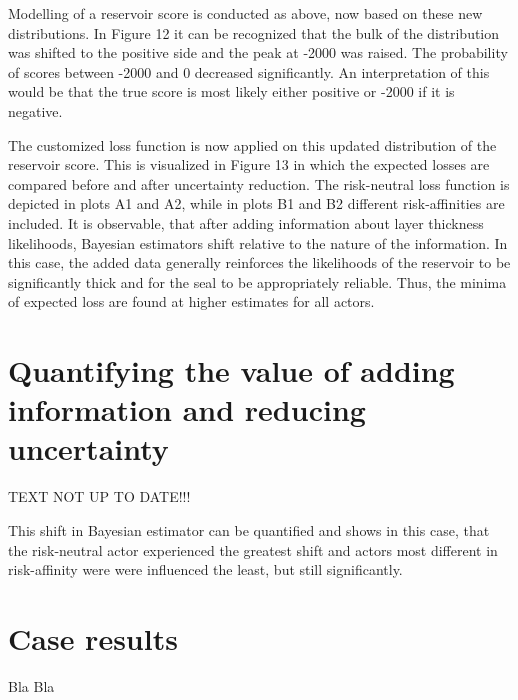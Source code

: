 	Modelling of a reservoir score is conducted as above, now based on these new distributions. In Figure 12 it can be recognized that the bulk of the distribution was shifted to the positive side and the peak at -2000 was raised. The probability of scores between -2000 and 0 decreased significantly. An interpretation of this would be that the true score is most likely either positive or -2000 if it is negative.
	
	The customized loss function is now applied on this updated distribution of the reservoir score. This is visualized in Figure 13 in which the expected losses are compared before and after uncertainty reduction. The risk-neutral loss function is depicted in plots A1 and A2, while in plots B1 and B2 different risk-affinities are included. It is observable, that after adding information about layer thickness likelihoods, Bayesian estimators shift relative to the nature of the information. In this case, the added data generally reinforces the likelihoods of the reservoir to be significantly thick and for the seal to be appropriately reliable. Thus, the minima of expected loss are found at higher estimates for all actors. 
	
	\section{Quantifying the value of adding information and reducing uncertainty}
	
	TEXT NOT UP TO DATE!!!
	
	This shift in Bayesian estimator can be quantified and shows in this case, that the risk-neutral actor experienced the greatest shift and actors most different in risk-affinity were were influenced the least, but still significantly.
	
	\section{Case results}
	
	Bla Bla